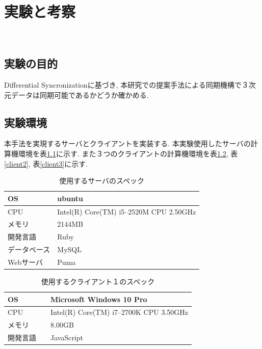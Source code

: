 \chapter{実験と考察}　\label{chap:test}
\section{実験の目的}
Differential Syncronizationに基づき, 本研究での提案手法による同期機構で３次元データは同期可能であるかどうか確かめる.
\section{実験環境}
本手法を実現するサーバとクライアントを実装する. 本実験使用したサーバの計算機環境を表\ref{server}に示す. また３つのクライアントの計算機環境を表\ref{client1}, 表\ref{client2}, 表\ref{client3}に示す.
\begin{table}[htbp]
\begin{center}
	\caption{使用するサーバのスペック}
	\begin{tabular}{|l|l|} \hline
		OS & ubuntu \\ \hline
		CPU &  Intel(R) Core(TM) i5--2520M CPU 2.50GHz\\ \hline
		メモリ & 2144MB \\ \hline
    開発言語　& Ruby \\ \hline
		データベース & MySQL \\ \hline
		Webサーバ & Puma\\ \hline
	\end{tabular}
	\label{server}
\end{center}
\end{table}

\begin{table}[htbp]
\begin{center}
	\caption{使用するクライアント１のスペック}
	\begin{tabular}{|l|l|} \hline
		OS & Microsoft Windows 10 Pro \\ \hline
		CPU & Intel(R) Core(TM) i7--2700K CPU 3.50GHz \\ \hline
		メモリ & 8.00GB \\ \hline
    開発言語　& JavaScript \\ \hline
	\end{tabular}
	\label{client1}
\end{center}
\end{table}

